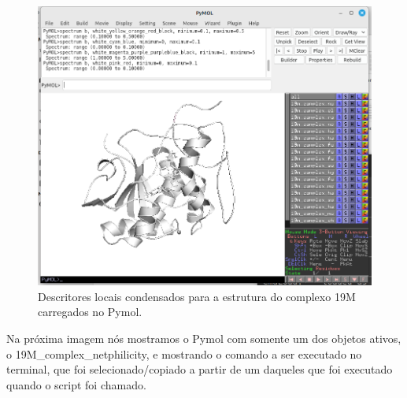 \documentclass[a4paper,11pt]{refart}
\begin{document}
	\hspace*{-\leftmarginwidth}
	\begin{minipage}{\fullwidth}
		\begin{figure}[H]
			\begin{center}
				\includegraphics[width=5in]{pymol_window2}
				\caption{Descritores locais condensados para a estrutura do complexo 19M 	carregados no Pymol.}
				\label{pymol_window2}
			\end{center}
		\end{figure}
	\end{minipage}

	Na próxima imagem nós mostramos o Pymol com somente um dos objetos ativos, o 19M\_complex\_netphilicity, e mostrando o comando a ser executado no terminal, que foi selecionado/copiado a partir de um daqueles que foi executado quando o script foi chamado.
\end{document}
